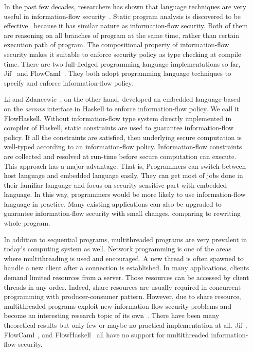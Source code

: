 In the past few decades, researchers has shown that language techniques are 
very useful in information-flow security~\cite{Sabelfeld:Myers:JSAC}. Static
program analysis is discovered to be effective~\cite{Denning:Denning:Certification}
because it has similar nature as information-flow security. Both of
them are reasoning on all branches of program at the same time, rather than
certain execution path of program. The compositional property of 
information-flow security makes it suitable to enforce security policy as
type checking at compile time. There are two full-fledged programming language
implementations so far, Jif~\cite{jif} and FlowCaml~\cite{FlowCaml}. 
They both adopt programming language techniques to specify and enforce 
information-flow policy.

Li and Zdancewic~\cite{Li:Zdancewic:CSFW}, on the other hand, developed an 
embedded language based on the {\em arrows} interface in Haskell to enforce 
information-flow policy. We call it FlowHaskell.
Without information-flow type system directly implemented in compiler
of Haskell, static constraints are used to guarantee information-flow policy. 
If all the constraints are satisfied, then underlying secure computation is 
well-typed according to an information-flow policy.
Information-flow constraints are collected and resolved at run-time before 
secure computation can execute. This approach has a major advantage.  
That is, Programmers can switch between host language and embedded 
language easily. They can get most of jobs done in their familiar
language and focus on security sensitive part with embedded language.
In this way, programmers would be more likely to use information-flow
language in practice. Many existing applications can also be upgraded
to guarantee information-flow security with small changes, comparing to 
rewriting whole program.

In addition to sequential programs, multithreaded programs are very 
prevalent in today's computing system as well. Network programming
is one of the areas where multithreading is used and encouraged.
A new thread is often spawned to handle a new client after a connection
is established. In many applications, clients demand limited resources
from a server. Those resources can be accessed by client threads in
any order. Indeed, share resources are usually required in concurrent
programming with producer-consumer pattern.
However, due to share resource, multithreaded programs exploit new
information-flow security problems and become an interesting 
research topic of its own~\cite{Sabelfeld:Myers:JSAC}. There have
been many theoretical results but only few or maybe no practical
implementation at all. Jif~\cite{jif}, FlowCaml~\cite{FlowCaml},
and FlowHaskell~\cite{Li:Zdancewic:CSFW} all
have no support for multithreaded information-flow security.

